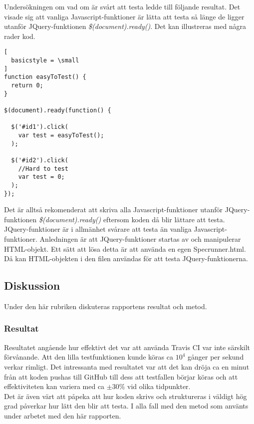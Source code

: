 Undersökningen om vad om är svårt att testa ledde till följande resultat.
Det visade sig att vanliga Javascript-funktioner är lätta
att testa så länge de ligger utanför JQuery-funktionen
\emph{\$(document).ready()}. Det kan illustreras med några
rader kod.

\begin{lstlisting}[
  basicstyle = \small
]
function easyToTest() {
  return 0;
}

$(document).ready(function() {

  $('#id1').click(
    var test = easyToTest(); 
  );

  $('#id2').click(
    //Hard to test
    var test = 0; 
  );
});

\end{lstlisting}

Det är alltså rekomenderat att skriva alla Javascript-funktioner utanför 
JQuery-funktionen \emph{\$(document).ready()} eftersom koden då blir 
lättare att testa.\\

JQuery-funktioner är i allmänhet svårare att testa än vanliga
Javascript-funktioner. Anledningen är att JQuery-funktioner
startas av och manipulerar HTML-objekt. Ett sätt att lösa detta är
att använda en egen \textunderscore Specrunner.html. Då kan HTML-objekten i den
filen användas för att testa JQuery-funktionerna.

\subsection{Diskussion}
Under den här rubriken diskuteras rapportens resultat
och metod.

\subsubsection{Resultat}
Resultatet angående hur effektivt det var att använda Travis CI
var inte särskilt förvånande. Att den lilla testfunktionen kunde köras
ca $10^4$ gånger per sekund verkar rimligt. Det intressanta med resultatet
var att det kan dröja ca en minut från att koden pushas till GitHub
till dess att testfallen börjar köras och att effektiviteten
kan variera med ca $\pm 30 \%$ vid olika tidpunkter.\\

Det är även värt att påpeka att hur koden skrivs och struktureras
i väldigt hög grad påverkar hur lätt den blir att testa. I alla fall
med den metod som använts under arbetet med den här rapporten.

